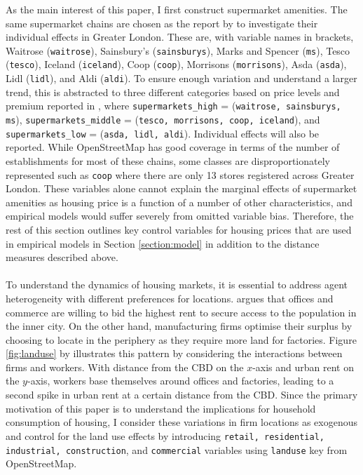 \documentclass{article}
\begin{document}
As the main interest of this paper, I first construct supermarket amenities. The same supermarket chains are chosen as the report by \citet{LloydsBank2016LivingHome} to investigate their individual effects in Greater London. These are, with variable names in brackets, Waitrose (\texttt{waitrose}), Sainsbury's (\texttt{sainsburys}), Marks and Spencer (\texttt{ms}), Tesco (\texttt{tesco}), Iceland (\texttt{iceland}), Coop (\texttt{coop}), Morrisons (\texttt{morrisons}), Asda (\texttt{asda}), Lidl (\texttt{lidl}), and Aldi (\texttt{aldi}). To ensure enough variation and understand a larger trend, this is abstracted to three different categories based on price levels and premium reported in \citet{LloydsBank2016LivingHome}, where \texttt{supermarkets\_high} = (\texttt{waitrose, sainsburys, ms}), \texttt{supermarkets\_middle} = (\texttt{tesco, morrisons, coop, iceland}), and \texttt{supermarkets\_low} = (\texttt{asda, lidl, aldi}). Individual effects will also be reported. While OpenStreetMap has good coverage in terms of the number of establishments for most of these chains, some classes are disproportionately represented such as \texttt{coop} where there are only 13 stores registered across Greater London. These variables alone cannot explain the marginal effects of supermarket amenities as housing price is a function of a number of other characteristics, and empirical models would suffer severely from omitted variable bias. Therefore, the rest of this section outlines key control variables for housing prices that are used in empirical models in Section \ref{section:model} in addition to the distance measures described above.\\\\
To understand the dynamics of housing markets, it is essential to address agent heterogeneity with different preferences for locations. \citet{AlonsoWilliam1964Lalu} argues that offices and commerce are willing to bid the highest rent to secure access to the population in the inner city. On the other hand, manufacturing firms optimise their surplus by choosing to locate in the periphery as they require more land for factories. Figure \ref{fig:landuse} by \citet{OSullivan2011UrbanEconomics} illustrates this pattern by considering the interactions between firms and workers. With distance from the CBD on the $x$-axis and urban rent on the $y$-axis, workers base themselves around offices and factories, leading to a second spike in urban rent at a certain distance from the CBD. Since the primary motivation of this paper is to understand the implications for household consumption of housing, I consider these variations in firm locations as exogenous and control for the land use effects by introducing \texttt{retail, residential, industrial, construction}, and \texttt{commercial} variables using \texttt{landuse} key from OpenStreetMap.
\end{document}
